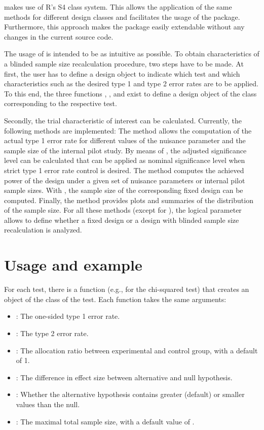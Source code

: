  makes use of R's S4 class system. This allows the
application of the same methods for different design classes and
facilitates the usage of the package. Furthermore, this approach makes
the package easily extendable without any changes in the current source
code.

The usage of  is intended to be as intuitive as
possible. To obtain characteristics of a blinded sample size
recalculation procedure, two steps have to be made. At first, the user
has to define a design object to indicate which test and which
characteristics such as the desired type 1 and type 2 error rates are to
be applied. To this end, the three functions ,
, and  exist to define a
design object of the class corresponding to the respective test.

Secondly, the trial characteristic of interest can be calculated.
Currently, the following methods are implemented: The method 
allows the computation of the actual type 1 error rate for different
values of the nuisance parameter and the sample size of the internal
pilot study. By means of , the adjusted
significance level can be calculated that can be applied as nominal
significance level when strict type 1 error rate control is desired. The
method  computes the achieved power of the design under a
given set of nuisance parameters or internal pilot sample sizes. With
, the sample size of the corresponding fixed design can be
computed. Finally, the method  provides plots and
summaries of the distribution of the sample size. For all these methods
(except for ), the logical parameter 
allows to define whether a fixed design or a design with blinded sample
size recalculation is analyzed.

\hypertarget{usage-and-example}{%
\section{Usage and example}\label{usage-and-example}}

For each test, there is a  function (e.g.,
 for the chi-squared test) that creates an object
of the class of the test. Each  function takes the same
arguments:

\begin{itemize}
\tightlist
\item
  : The one-sided type 1 error rate.
\item
  : The type 2 error rate.
\item
  : The allocation ratio between experimental and control group,
  with a default of 1.
\item
  : The difference in effect size between alternative and
  null hypothesis.
\item
  : Whether the alternative hypothesis contains
  greater (default) or smaller values than the null.
\item
  : The maximal total sample size, with a default value of
  .
\end{itemize}

